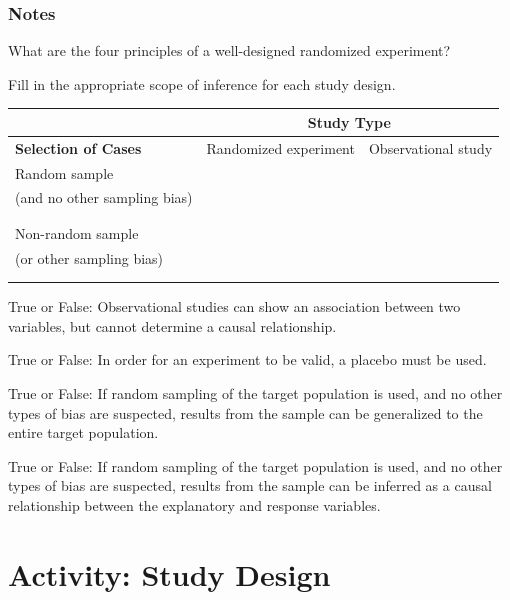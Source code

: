 \documentclass[
]{report}
\newcommand{\rgs}{\vspace{12pt}} %
\begin{document}
\hypertarget{notes-2}{%
\subsubsection*{Notes}\label{notes-2}}

What are the four principles of a well-designed randomized experiment?\\
\rgs
\rgs
\rgs

Fill in the appropriate scope of inference for each study design.

\begin{center}
\begin{tabular}{|p{2in}|p{2in}|p{2in}|}
\hline
 & \multicolumn{2}{|c|}{\textbf{Study Type}} \\ \hline
 \textbf{Selection of Cases} & Randomized experiment & Observational study \\ \hline
 Random sample && \\ 
 (and no other sampling bias) & & \\ 
  & & \\
   & & \\ \hline
   Non-random sample && \\ 
   (or other sampling bias) & & \\ 
  & & \\
   & & \\ \hline
\end{tabular}
\end{center}

\rgs

True or False: Observational studies can show an association between two variables, but cannot determine a causal relationship.

True or False: In order for an experiment to be valid, a placebo must be used.

True or False: If random sampling of the target population is used, and no other types of bias are suspected, results from the sample can be generalized to the entire target population.

True or False: If random sampling of the target population is used, and no other types of bias are suspected, results from the sample can be inferred as a causal relationship between the explanatory and response variables.

\newpage

\hypertarget{activity-study-design}{%
\section{Activity: Study Design}\label{activity-study-design}}
\end{document}
